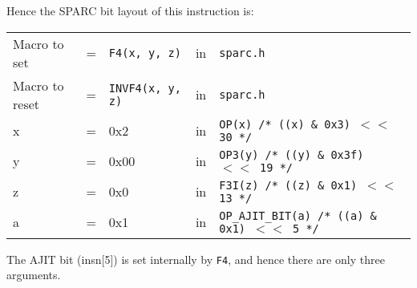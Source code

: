 \begin{enumerate}
  Hence the SPARC bit layout of this instruction is:

  \begin{tabular}[h]{lclcl}
    Macro to set  &=& \texttt{F4(x, y, z)} &in& \texttt{sparc.h}     \\
    Macro to reset  &=& \texttt{INVF4(x, y, z)} &in& \texttt{sparc.h}     \\
    x &=& 0x2      &in& \texttt{OP(x)  /* ((x) \& 0x3)  $<<$ 30 */} \\
    y &=& 0x00     &in& \texttt{OP3(y) /* ((y) \& 0x3f) $<<$ 19 */} \\
    z &=& 0x0      &in& \texttt{F3I(z) /* ((z) \& 0x1)  $<<$ 13 */} \\
    a &=& 0x1      &in& \texttt{OP\_AJIT\_BIT(a) /* ((a) \& 0x1)  $<<$ 5 */}
  \end{tabular}

  The AJIT bit  (insn[5]) is set internally by  \texttt{F4}, and hence
  there are only three arguments.


\end{enumerate}
